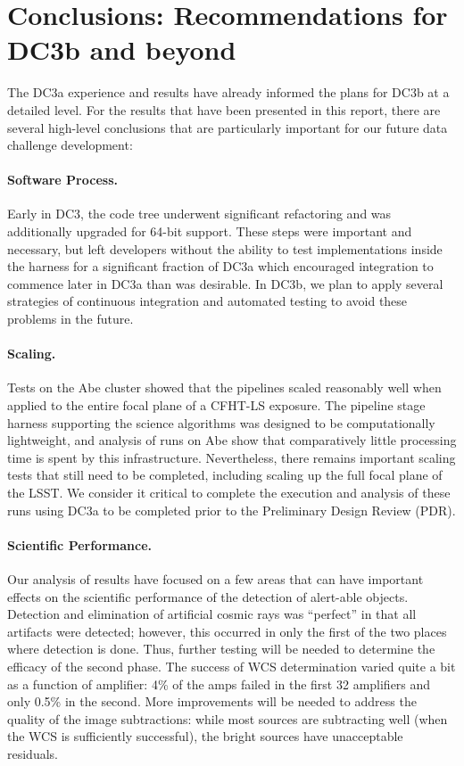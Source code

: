 
\section{Conclusions:  Recommendations for DC3b and beyond}

The DC3a experience and results have already informed the plans for
DC3b at a detailed level.  For the results that have been presented in
this report, there are several high-level conclusions that are
particularly important for our future data challenge development:

\paragraph{Software Process.}  Early in DC3, the code tree underwent
significant refactoring and was additionally upgraded for 64-bit
support. These steps were important and necessary, but left developers
without the ability to test implementations inside the harness for a
significant fraction of DC3a which encouraged integration to commence
later in DC3a than was desirable.  In DC3b, we plan to apply several
strategies of continuous integration and automated testing to avoid
these problems in the future.  

\paragraph{Scaling.}  Tests on the Abe cluster showed that the
pipelines scaled reasonably well when applied to the entire focal
plane of a CFHT-LS exposure. The pipeline stage harness supporting the
science algorithms was designed to be computationally lightweight, and
analysis of runs on Abe show that comparatively little processing time
is spent by this infrastructure.  Nevertheless, there remains
important scaling tests that still need to be completed, including
scaling up the full focal plane of the LSST.  We consider it critical
to complete the execution and analysis of these runs using DC3a to be
completed prior to the Preliminary Design Review (PDR).  

\paragraph{Scientific Performance.}  Our analysis of results have
focused on a few areas that can have important effects on the scientific
performance of the detection of alert-able objects.  Detection and
elimination of artificial cosmic rays was ``perfect'' in that all
artifacts were detected; however, this occurred in only the first of
the two places where detection is done.  Thus, further testing will be
needed to determine the efficacy of the second phase.  The success of
WCS determination varied quite a bit as a function of amplifier: 4\%
of the amps failed in the first 32 amplifiers and only 0.5\% in the
second.  More improvements will be needed to address the quality of
the image
subtractions:  while most sources are subtracting well (when the WCS is
sufficiently successful),  the bright sources have unacceptable residuals.

